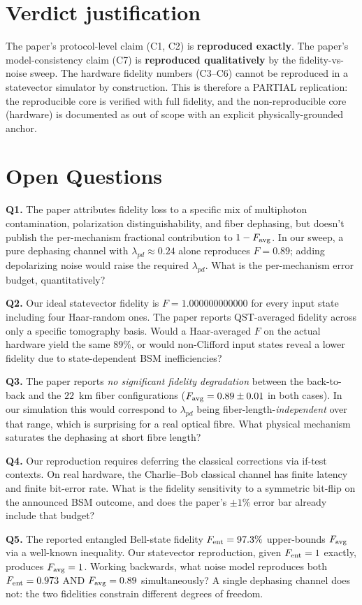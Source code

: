 \documentclass[11pt]{article}
\begin{document}
\section{Verdict justification}

The paper's protocol-level claim (C1, C2) is \textbf{reproduced exactly}.
The paper's model-consistency claim (C7) is \textbf{reproduced qualitatively}
by the fidelity-vs-noise sweep. The hardware fidelity numbers (C3--C6)
cannot be reproduced in a statevector simulator by construction. This is
therefore a PARTIAL replication: the reproducible core is verified with
full fidelity, and the non-reproducible core (hardware) is documented as
out of scope with an explicit physically-grounded anchor.

\section*{Open Questions}
\label{sec:openq}

\textbf{Q1.} The paper attributes fidelity loss to a specific mix of
multiphoton contamination, polarization distinguishability, and fiber
dephasing, but doesn't publish the per-mechanism fractional contribution
to $1 - F_{\rm avg}$. In our sweep, a pure dephasing channel with
$\lambda_{pd} \approx 0.24$ alone reproduces $F = 0.89$; adding depolarizing
noise would raise the required $\lambda_{pd}$. What is the per-mechanism
error budget, quantitatively?

\textbf{Q2.} Our ideal statevector fidelity is $F = 1.000000000000$ for
every input state including four Haar-random ones. The paper reports
QST-averaged fidelity across only a specific tomography basis. Would a
Haar-averaged $F$ on the actual hardware yield the same $89\%$, or would
non-Clifford input states reveal a lower fidelity due to state-dependent
BSM inefficiencies?

\textbf{Q3.} The paper reports \emph{no significant fidelity degradation}
between the back-to-back and the $22$~km fiber configurations ($F_{\rm avg}
= 0.89 \pm 0.01$ in both cases). In our simulation this would correspond
to $\lambda_{pd}$ being fiber-length-\emph{independent} over that range,
which is surprising for a real optical fibre. What physical mechanism
saturates the dephasing at short fibre length?

\textbf{Q4.} Our reproduction requires deferring the classical corrections
via if-test contexts. On real hardware, the Charlie--Bob classical channel
has finite latency and finite bit-error rate. What is the fidelity
sensitivity to a symmetric bit-flip on the announced BSM outcome, and
does the paper's $\pm 1\%$ error bar already include that budget?

\textbf{Q5.} The reported entangled Bell-state fidelity $F_{\rm ent} =
97.3\%$ upper-bounds $F_{\rm avg}$ via a well-known inequality. Our
statevector reproduction, given $F_{\rm ent} = 1$ exactly, produces
$F_{\rm avg} = 1$. Working backwards, what noise model reproduces both
$F_{\rm ent} = 0.973$ AND $F_{\rm avg} = 0.89$ simultaneously? A single
dephasing channel does not: the two fidelities constrain different
degrees of freedom.
\end{document}
